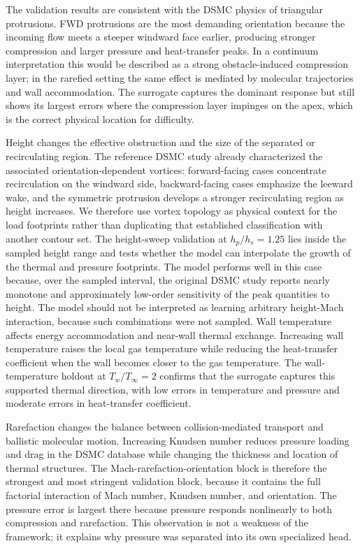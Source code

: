 \documentclass[aip,pof,preprint,notitlepage,floatfix,amsmath,amssymb]{revtex4-2}
\begin{document}
The validation results are consistent with the DSMC physics of triangular protrusions. FWD protrusions are the most demanding orientation because the incoming flow meets a steeper windward face earlier, producing stronger compression and larger pressure and heat-transfer peaks. In a continuum interpretation this would be described as a strong obstacle-induced compression layer; in the rarefied setting the same effect is mediated by molecular trajectories and wall accommodation. The surrogate captures the dominant response but still shows its largest errors where the compression layer impinges on the apex, which is the correct physical location for difficulty.

Height changes the effective obstruction and the size of the separated or recirculating region. The reference DSMC study already characterized the associated orientation-dependent vortices: forward-facing cases concentrate recirculation on the windward side, backward-facing cases emphasize the leeward wake, and the symmetric protrusion develops a stronger recirculating region as height increases. We therefore use vortex topology as physical context for the load footprints rather than duplicating that established classification with another contour set. The height-sweep validation at $h_p/h_s=1.25$ lies inside the sampled height range and tests whether the model can interpolate the growth of the thermal and pressure footprints. The model performs well in this case because, over the sampled interval, the original DSMC study reports nearly monotone and approximately low-order sensitivity of the peak quantities to height. The model should not be interpreted as learning arbitrary height-Mach interaction, because such combinations were not sampled. Wall temperature affects energy accommodation and near-wall thermal exchange. Increasing wall temperature raises the local gas temperature while reducing the heat-transfer coefficient when the wall becomes closer to the gas temperature. The wall-temperature holdout at $T_w/T_\infty=2$ confirms that the surrogate captures this supported thermal direction, with low errors in temperature and pressure and moderate errors in heat-transfer coefficient.

Rarefaction changes the balance between collision-mediated transport and ballistic molecular motion. Increasing Knudsen number reduces pressure loading and drag in the DSMC database while changing the thickness and location of thermal structures. The Mach-rarefaction-orientation block is therefore the strongest and most stringent validation block, because it contains the full factorial interaction of Mach number, Knudsen number, and orientation. The pressure error is largest there because pressure responds nonlinearly to both compression and rarefaction. This observation is not a weakness of the framework; it explains why pressure was separated into its own specialized head.
\end{document}
